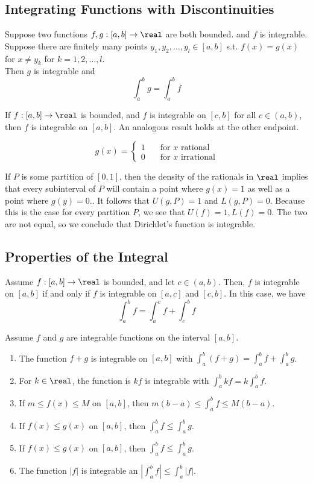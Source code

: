 \documentclass[11pt]{article}
\begin{document}
\subsection{Integrating Functions with Discontinuities}
\fact Suppose two functions $f, g: [a,b] \rightarrow \real$ are both bounded. and $f$ is integrable. Suppose there are finitely many points $y_1, y_2, \hdots, y_l \in [a,b]$ s.t.
$f(x) = g(x)$ for $x \neq y_k$ for $k = 1, 2, \hdots, l$.\\
Then $g$ is integrable and
$$\int_a^b g = \int_a^b f$$

\theorem If $f: [a,b] \rightarrow \real$ is bounded, and $f$ is integrable on $[c,b]$ for all $c \in (a,b)$, then $f$ is integrable on $[a,b]$. An analogous result holds at the other endpoint.

$$g(x) = \begin{cases}
	1 \quad &\text{for $x$ rational} \\
	0 \quad &\text{for $x$ irrational}
\end{cases}$$

If $P$ is some partition of $[0,1]$, then the density of the rationals in $\real$ implies that every subinterval of $P$ will contain a point where $g(x) = 1$ as well as a point where $g(y) = 0$.. It follows that $U(g, P) = 1$ and $L(g, P) = 0$. Because this is the case for every partition $P$, we see that $U(f) = 1, L(f) = 0$. The two are not equal, so we conclude that Dirichlet's function is  integrable.

\subsection{Properties of the Integral}
\theorem Assume $f: [a,b] \rightarrow \real$ is bounded, and let $c \in (a,b)$. Then, $f$ is integrable on $[a,b]$ if and only if $f$ is integrable on $[a,c]$ and $[c,b]$. In this case, we have
$$\int_a^b f = \int_a^c f + \int_c^b f$$

\theorem Assume $f$ and $g$ are integrable functions on the interval $[a,b]$.
\begin{enumerate}
	\item The function $f + g$ is integrable on $[a,b]$ with $\int_a^b(f + g) = \int_a^b f + \int_a^b g$.
	\item For $k \in \real$, the function is $kf$ is integrable with $\int_a^b kf = k\int_a^b f$.
	\item If $m \leq f(x) \leq M$ on $[a,b]$, then $m(b-a) \leq \int_a^b f \leq M(b-a)$.
	\item If $f(x) \leq g(x)$ on $[a,b]$, then $\int_a^b f \leq \int_a^b g$.
	\item If $f(x) \leq g(x)$ on $[a,b]$, then $\int_a^b f \leq \int_a^b g$.
	\item The function $|f|$ is integrable an $|\int_a^b f| \leq \int_a^b|f|$.
\end{enumerate}
\end{document}
